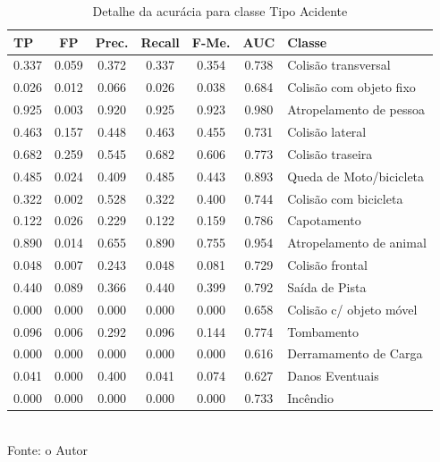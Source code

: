 \begin{enumerate}
		\begin{table}[!ht]
			\centering
			\caption{Detalhe da acurácia para classe Tipo Acidente}
			\vspace{1mm}
			\begin{tabular}{l|c|c|c|c|c|l}
				\hline
				\textbf{TP} & \textbf{FP} & \textbf{Prec.} & \textbf{Recall} & \textbf{F-Me.} & \textbf{AUC} & \textbf{Classe} \\
				\hline
				0.337 & 0.059 & 0.372 & 0.337 & 0.354 & 0.738 & Colisão transversal \\
				0.026 & 0.012 & 0.066 & 0.026 & 0.038 & 0.684 & Colisão com objeto fixo \\
				0.925 &	0.003 &	0.920 & 0.925 & 0.923 & 0.980 & Atropelamento de pessoa \\
				0.463 &	0.157 &	0.448 &	0.463 &	0.455 &	0.731 &	Colisão lateral \\
				0.682 &	0.259 & 0.545 & 0.682 & 0.606 & 0.773 & Colisão traseira \\
				0.485 & 0.024 & 0.409 & 0.485 & 0.443 & 0.893 & Queda de Moto/bicicleta \\
				0.322 & 0.002 & 0.528 & 0.322 & 0.400 & 0.744 & Colisão com bicicleta \\
				0.122 & 0.026 & 0.229 & 0.122 & 0.159 & 0.786 & Capotamento \\
				0.890 & 0.014 & 0.655 & 0.890 & 0.755 & 0.954 & Atropelamento de animal \\
				0.048 & 0.007 & 0.243 & 0.048 & 0.081 & 0.729 & Colisão frontal \\
				0.440 & 0.089 & 0.366 & 0.440 & 0.399 & 0.792 & Saída de Pista \\
				0.000 & 0.000 & 0.000 & 0.000 & 0.000 & 0.658 & Colisão c/ objeto móvel\\
				0.096 & 0.006 & 0.292 & 0.096 & 0.144 & 0.774 & Tombamento \\
				0.000 & 0.000 & 0.000 & 0.000 & 0.000 & 0.616 & Derramamento de Carga \\
				0.041 & 0.000 & 0.400 & 0.041 & 0.074 & 0.627 & Danos Eventuais \\
				0.000 & 0.000 & 0.000 & 0.000 & 0.000 & 0.733 & Incêndio \\	
			\end{tabular}
			\\
			\tiny Fonte: o Autor
		\end{table}
		

\end{enumerate}
